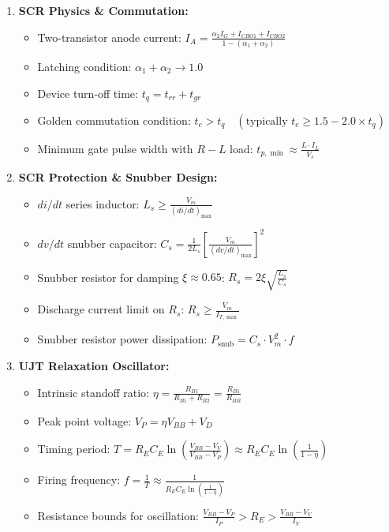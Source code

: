 \documentclass[11pt,a4paper]{article}
\begin{document}
\begin{formulabox}
\begin{enumerate}[leftmargin=*,itemsep=1.5pt,topsep=1pt,parsep=0pt]
  \item \textbf{SCR Physics \& Commutation:}
  \begin{itemize}
    \item Two-transistor anode current: $I_A = \frac{\alpha_2 I_G + I_{CBO1} + I_{CBO2}}{1 - (\alpha_1 + \alpha_2)}$
    \item Latching condition: $\alpha_1 + \alpha_2 \longrightarrow 1.0$
    \item Device turn-off time: $t_q = t_{rr} + t_{gr}$
    \item Golden commutation condition: $t_c > t_q \quad (\text{typically } t_c \ge 1.5 - 2.0 \times t_q)$
    \item Minimum gate pulse width with $R-L$ load: $t_{p,\min} \approx \frac{L \cdot I_L}{V_s}$
  \end{itemize}

  \item \textbf{SCR Protection \& Snubber Design:}
  \begin{itemize}
    \item $di/dt$ series inductor: $L_s \ge \frac{V_m}{(di/dt)_{\max}}$
    \item $dv/dt$ snubber capacitor: $C_s = \frac{1}{2 L_s} \left[\frac{V_m}{(dv/dt)_{\max}}\right]^2$
    \item Snubber resistor for damping $\xi \approx 0.65$: $R_s = 2 \xi \sqrt{\frac{L_s}{C_s}}$
    \item Discharge current limit on $R_s$: $R_s \ge \frac{V_m}{I_{T,\max}}$
    \item Snubber resistor power dissipation: $P_{\text{snub}} = C_s \cdot V_m^2 \cdot f$
  \end{itemize}

  \item \textbf{UJT Relaxation Oscillator:}
  \begin{itemize}
    \item Intrinsic standoff ratio: $\eta = \frac{R_{B1}}{R_{B1} + R_{B2}} = \frac{R_{B1}}{R_{BB}}$
    \item Peak point voltage: $V_P = \eta V_{BB} + V_D$
    \item Timing period: $T = R_E C_E \ln\left(\frac{V_{BB} - V_V}{V_{BB} - V_P}\right) \approx R_E C_E \ln\left(\frac{1}{1 - \eta}\right)$
    \item Firing frequency: $f = \frac{1}{T} \approx \frac{1}{R_E C_E \ln\left(\frac{1}{1 - \eta}\right)}$
    \item Resistance bounds for oscillation: $\frac{V_{BB} - V_P}{I_P} > R_E > \frac{V_{BB} - V_V}{I_V}$
  \end{itemize}


\end{enumerate}
\end{formulabox}
\end{document}
